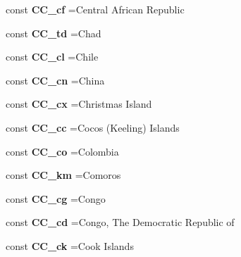 \begin{DoxyCompactItemize}
const {\bfseries C\+C\+\_\+cf} =\textquotesingle{}Central African Republic\textquotesingle{}
\item 
\hypertarget{class_i_s_o_a43c439529ab1774b2e5764b1bd8d66c7}{}\label{class_i_s_o_a43c439529ab1774b2e5764b1bd8d66c7} 
const {\bfseries C\+C\+\_\+td} =\textquotesingle{}Chad\textquotesingle{}
\item 
\hypertarget{class_i_s_o_aec418875b0793a704961b274af7c9302}{}\label{class_i_s_o_aec418875b0793a704961b274af7c9302} 
const {\bfseries C\+C\+\_\+cl} =\textquotesingle{}Chile\textquotesingle{}
\item 
\hypertarget{class_i_s_o_af965d0ee53530325499aa679a79cef34}{}\label{class_i_s_o_af965d0ee53530325499aa679a79cef34} 
const {\bfseries C\+C\+\_\+cn} =\textquotesingle{}China\textquotesingle{}
\item 
\hypertarget{class_i_s_o_ac359ab46aff9f8673fa3bbb6040d81df}{}\label{class_i_s_o_ac359ab46aff9f8673fa3bbb6040d81df} 
const {\bfseries C\+C\+\_\+cx} =\textquotesingle{}Christmas Island\textquotesingle{}
\item 
\hypertarget{class_i_s_o_aa409364095cacc31e1301ba14c16d42e}{}\label{class_i_s_o_aa409364095cacc31e1301ba14c16d42e} 
const {\bfseries C\+C\+\_\+cc} =\textquotesingle{}Cocos (Keeling) Islands\textquotesingle{}
\item 
\hypertarget{class_i_s_o_a23d96801e2f874e079db92b68a5f752b}{}\label{class_i_s_o_a23d96801e2f874e079db92b68a5f752b} 
const {\bfseries C\+C\+\_\+co} =\textquotesingle{}Colombia\textquotesingle{}
\item 
\hypertarget{class_i_s_o_ab163e53d215c6dfa4af41b1557a0861a}{}\label{class_i_s_o_ab163e53d215c6dfa4af41b1557a0861a} 
const {\bfseries C\+C\+\_\+km} =\textquotesingle{}Comoros\textquotesingle{}
\item 
\hypertarget{class_i_s_o_a67922a835c21c0681cfdd6cea6aa1f05}{}\label{class_i_s_o_a67922a835c21c0681cfdd6cea6aa1f05} 
const {\bfseries C\+C\+\_\+cg} =\textquotesingle{}Congo\textquotesingle{}
\item 
\hypertarget{class_i_s_o_ab9a36147a5a40cf800b6ddcb7d954cd0}{}\label{class_i_s_o_ab9a36147a5a40cf800b6ddcb7d954cd0} 
const {\bfseries C\+C\+\_\+cd} =\textquotesingle{}Congo, The Democratic Republic of\textquotesingle{}
\item 
\hypertarget{class_i_s_o_a81d8b42c798b7c45b806950fe951c531}{}\label{class_i_s_o_a81d8b42c798b7c45b806950fe951c531} 
const {\bfseries C\+C\+\_\+ck} =\textquotesingle{}Cook Islands\textquotesingle{}
\item 
\hypertarget{class_i_s_o_a230fc4af36433bfa3c039ff8ee9d8332}{}\label{class_i_s_o_a230fc4af36433bfa3c039ff8ee9d8332} 

\end{DoxyCompactItemize}
